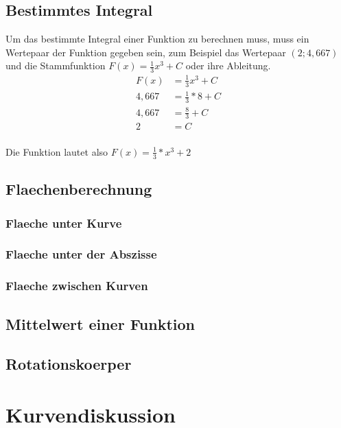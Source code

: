 \documentclass[a4paper]{article} %
\begin{document}
	\subsection{Bestimmtes Integral}
	Um das bestimmte Integral einer Funktion zu berechnen muss, muss ein Wertepaar der Funktion gegeben sein, zum Beispiel
	das Wertepaar $(2;4,667)$ und die Stammfunktion $F(x)=\frac{1}{3}x^3+C$ oder ihre Ableitung.\\
	\begin{align*}
	F(x) & =\frac{1}{3}x^3+C\\
	4,667 &= \frac{1}{3}*8+C\\
	4,667 &= \frac{8}{3}+C\\
	2 & =C
	\end{align*}\\
	Die Funktion lautet also $F(x)=\frac{1}{3}*x^3+2$
	\subsection{Flaechenberechnung}
	\subsubsection{Flaeche unter Kurve}
	\subsubsection{Flaeche unter der Abszisse}
	\subsubsection{Flaeche zwischen Kurven}
	\subsection{Mittelwert einer Funktion}
	\subsection{Rotationskoerper}                                                      
	\section{Kurvendiskussion}
\end{document}
